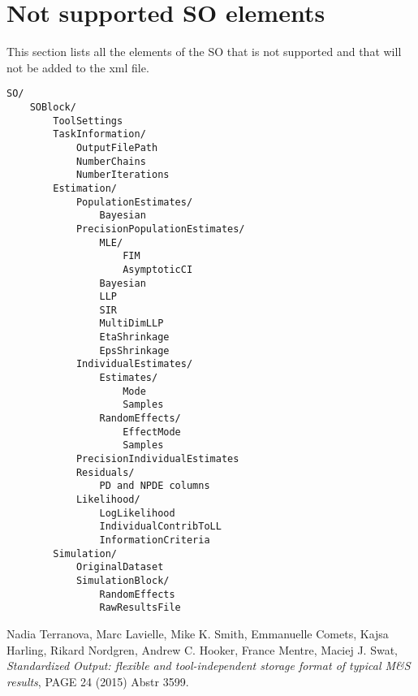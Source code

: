 \section{Not supported SO elements}

This section lists all the elements of the SO that is not supported and that will not be added to the xml file.

\begin{verbatim}
SO/
    SOBlock/
        ToolSettings
        TaskInformation/
            OutputFilePath
            NumberChains
            NumberIterations
        Estimation/
            PopulationEstimates/
                Bayesian
            PrecisionPopulationEstimates/
                MLE/
                    FIM
                    AsymptoticCI
                Bayesian
                LLP
                SIR
                MultiDimLLP
                EtaShrinkage
                EpsShrinkage
            IndividualEstimates/
                Estimates/
                    Mode
                    Samples
                RandomEffects/
                    EffectMode
                    Samples
            PrecisionIndividualEstimates
            Residuals/
                PD and NPDE columns
            Likelihood/
                LogLikelihood
                IndividualContribToLL
                InformationCriteria
        Simulation/
            OriginalDataset
            SimulationBlock/
                RandomEffects
                RawResultsFile
\end{verbatim}

\begin{thebibliography}{1}
 Nadia Terranova, Marc Lavielle, Mike K. Smith, 
Emmanuelle Comets, Kajsa Harling, Rikard Nordgren, Andrew C. Hooker, 
France Mentre, Maciej J. Swat,
{\em Standardized Output: flexible and tool-independent storage 
format of typical M\&S results}, PAGE 24 (2015) Abstr 3599.
\end{thebibliography}


